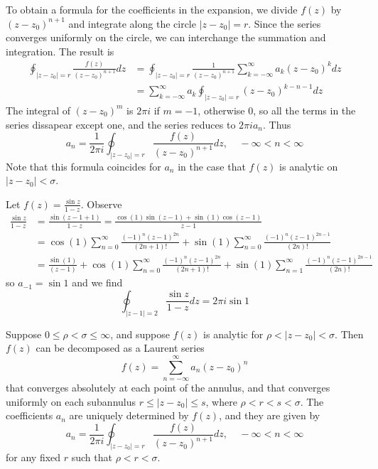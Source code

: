 To obtain a formula for the coefficients in the expansion, we divide $f(z)$ by $(z-z_0)^{n+1}$ and integrate along the circle $|z-z_0| = r$. Since the series converges uniformly on the circle, we can interchange the summation and integration. The result is \begin{align*}
    \oint_{|z-z_0|=r}\frac{f(z)}{(z-z_0)^{n+1}}dz &= \oint_{|z-z_0|=r}\frac{1}{(z-z_0)^{n+1}}\sum_{k=-\infty}^{\infty}a_k(z-z_0)^kdz \\
    &= \sum_{k=-\infty}^{\infty}a_k\oint_{|z-z_0|=r}(z-z_0)^{k-n-1}dz
\end{align*}
The integral of $(z-z_0)^m$ is $2\pi i$ if $m = -1$, otherwise $0$, so all the terms in the series dissapear except one, and the series reduces to $2\pi ia_n$. Thus \begin{equation*}
    a_n = \frac{1}{2\pi i}\oint_{|z-z_0|=r}\frac{f(z)}{(z-z_0)^{n+1}}dz,\;\;\;\;-\infty < n < \infty
\end{equation*}
Note that this formula coincides for $a_n$ in the case that $f(z)$ is analytic on $|z-z_0| < \sigma$.

\begin{example}
    Let $f(z) = \frac{\sin z}{1-z}$. Observe \begin{align*}
        \frac{\sin z}{1-z} &= \frac{\sin(z-1+1)}{1-z} = \frac{\cos(1)\sin(z-1)+\sin(1)\cos(z-1)}{z-1} \\
        &= \cos(1)\sum_{n=0}^{\infty}\frac{(-1)^n(z-1)^{2n}}{(2n+1)!}+\sin(1)\sum_{n=0}^{\infty}\frac{(-1)^n(z-1)^{2n-1}}{(2n)!} \\
        &= \frac{\sin(1)}{(z-1)} + \cos(1)\sum_{n=0}^{\infty}\frac{(-1)^n(z-1)^{2n}}{(2n+1)!}+\sin(1)\sum_{n=1}^{\infty}\frac{(-1)^n(z-1)^{2n-1}}{(2n)!}
    \end{align*}
    so $a_{-1} = \sin 1$ and we find \begin{equation*}
        \oint_{|z-1|=2}\frac{\sin z}{1-z}dz = 2\pi i\sin1
    \end{equation*}
\end{example}

\begin{theorem}
    Suppose $0 \leq \rho < \sigma \leq \infty$, and suppose $f(z)$ is analytic for $\rho < |z-z_0| < \sigma$. Then $f(z)$ can be decomposed as a Laurent series \begin{equation*}
        f(z) = \sum_{n=-\infty}^{\infty}a_n(z-z_0)^n
    \end{equation*}
    that converges absolutely at each point of the annulus, and that converges uniformly on each subannulus $r \leq |z-z_0| \leq s$, where $\rho < r < s < \sigma$. The coefficients $a_n$ are uniquely determined by $f(z)$, and they are given by \begin{equation*}
        a_n = \frac{1}{2\pi i}\oint_{|z-z_0|=r}\frac{f(z)}{(z-z_0)^{n+1}}dz,\;\;\;\;-\infty < n < \infty
    \end{equation*}
    for any fixed $r$ such that $\rho < r < \sigma$.
\end{theorem}


